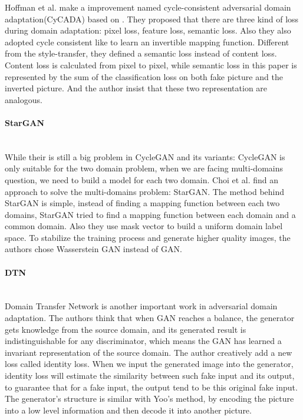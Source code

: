 \documentclass{kththesis}
\begin{document}
\noindent Hoffman et al. \cite{hoffman2017cycada} make a improvement named cycle-consistent adversarial domain adaptation(CyCADA) based on \cite{zhu2017unpaired}. They proposed that there are three kind of loss during domain adaptation: pixel loss, feature loss, semantic loss. Also they also adopted cycle consistent like\cite{zhu2017unpaired} to learn an invertible mapping function. Different from the style-transfer\cite{gatys2016image,johnson2016perceptual}, they defined a semantic loss instead of content loss. Content loss is calculated from pixel to pixel, while semantic loss in this paper is represented by the sum of the classification loss on both fake picture and the inverted picture. And the author insist that these two representation are analogous. 

\paragraph{StarGAN}~{}\\

\noindent While their is still a big problem in CycleGAN and its variants: CycleGAN is only suitable for the two domain problem, when we are facing multi-domains question, we need to build a model for each two domain. Choi et al.\cite{choi2017stargan} find an approach to solve the multi-domains problem: StarGAN. The method behind StarGAN is simple, instead of finding a mapping function between each two domains, StarGAN tried to find a mapping function between each domain and a common domain. Also they use mask vector to build a uniform domain label space. To stabilize the training process and generate higher quality images, the authors chose Wasserstein GAN\cite{arjovsky2017wasserstein} instead of GAN. 

\paragraph{DTN}~{}\\

\noindent Domain Transfer Network\cite{taigman2016unsupervised} is another important work in adversarial domain adaptation. The authors think that when GAN reaches a balance, the generator gets knowledge from the source domain, and its generated result is indistinguishable for any discriminator, which means the GAN has learned a invariant representation of the source domain. The author creatively add a new loss called identity loss. When we input the generated image into the generator, identity loss will estimate the similarity between such fake input and its output, to guarantee that for a fake input, the output tend to be this original fake input. The generator's structure is similar with Yoo's\cite{yoo2016pixel} method, by encoding the picture into a low level information and then decode it into another picture. 
\end{document}
